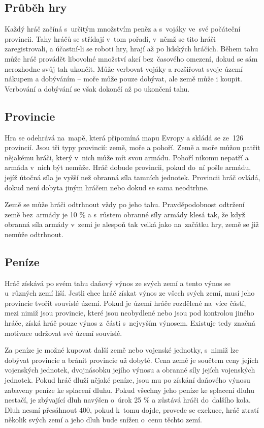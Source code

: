 \documentclass[a4paper,12pt]{article}
\begin{document}
\subsection{Průběh hry}
Každý hráč začíná s~určitým množstvím peněz a s~vojáky ve~své počáteční provincii. Tahy hráčů se střídají v~tom pořadí, v~němž se tito hráči zaregistrovali, a účastní-li se roboti hry, hrají až po lidských hráčích. Během tahu může hráč provádět libovolné množství akcí bez~časového omezení, dokud se sám nerozhodne svůj tah ukončit. Může verbovat vojáky a rozšiřovat svoje území nákupem a dobýváním -- moře může pouze dobývat, ale země může i koupit. Verbování a dobývání se však dokončí až po ukončení tahu.
\subsection{Provincie}
Hra se odehrává na~mapě, která připomíná mapu Evropy a skládá se ze~126 provincií. Jsou tři typy provincií: země, moře a pohoří. Země a moře můžou patřit nějakému hráči, který v~nich může mít svou armádu. Pohoří nikomu nepatří a armáda v~nich být nemůže. Hráč dobude provincii, pokud do~ní pošle armádu, jejíž útočná síla je vyšší než obranná síla tamních jednotek. Provincii hráč ovládá, dokud není dobyta jiným hráčem nebo dokud se sama neodtrhne.

Země se může hráči odtrhnout vždy po jeho tahu. Pravděpodobnost odtržení země bez~armády je 10 \% a s~růstem obranné síly armády klesá tak, že když obranná síla armády v~zemi je alespoň tak velká jako na~začátku hry, země se již nemůže odtrhnout.
\subsection{Peníze}
Hráč získává po svém tahu daňový výnos ze svých zemí a tento výnos se u~různých zemí liší. Jestli chce hráč získat výnos ze všech svých zemí, musí jeho provincie tvořit souvislé území. Pokud je území hráče rozdělené na~více částí, mezi nimiž jsou provincie, které jsou neobydlené nebo jsou pod kontrolou jiného hráče, získá hráč pouze výnos z~části s~nejvyším výnosem. Existuje tedy značná motivace udržovat své území souvislé.

Za peníze je možné kupovat další země nebo vojenské jednotky, s~nimiž lze dobývat provincie a bránit provincie už dobyté. Cena země je součtem ceny jejích vojenských jednotek, dvojnásobku jejího výnosu a obranné síly jejích vojenských jednotek. Pokud hráč dluží nějaké peníze, jsou mu po získání daňového výnosu zabaveny peníze ke splacení dluhu. Pokud všechny jeho peníze ke splacení dluhu nestačí, je zbývající dluh navýšen o~úrok 25 \% a zůstává hráči do~dalšího kola. Dluh nesmí přesáhnout 400, pokud k~tomu dojde, provede se exekuce, hráč ztratí několik svých zemí a jeho dluh bude snížen o~cenu těchto zemí.
\end{document}
